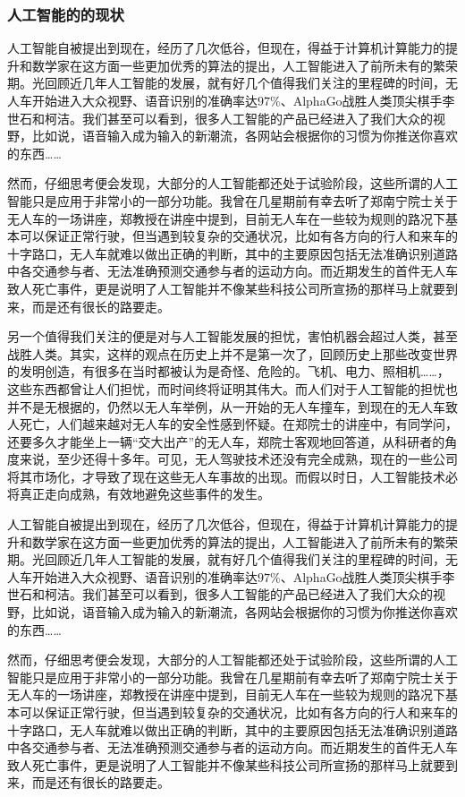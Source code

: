 \documentclass[UTF8]{XJTUthesis}
\begin{document}
\subsubsection{人工智能的的现状}
人工智能自被提出到现在，经历了几次低谷，但现在，得益于计算机计算能力的提升和数学家在这方面一些更加优秀的算法的提出，人工智能进入了前所未有的繁荣期。光回顾近几年人工智能的发展，就有好几个值得我们关注的里程碑的时间，无人车开始进入大众视野、语音识别的准确率达$97\%$、AlphaGo战胜人类顶尖棋手李世石和柯洁。我们甚至可以看到，很多人工智能的产品已经进入了我们大众的视野，比如说，语音输入成为输入的新潮流，各网站会根据你的习惯为你推送你喜欢的东西……\par
然而，仔细思考便会发现，大部分的人工智能都还处于试验阶段，这些所谓的人工智能只是应用于非常小的一部分功能。我曾在几星期前有幸去听了郑南宁院士关于无人车的一场讲座，郑教授在讲座中提到，目前无人车在一些较为规则的路况下基本可以保证正常行驶，但当遇到较复杂的交通状况，比如有各方向的行人和来车的十字路口，无人车就难以做出正确的判断，其中的主要原因包括无法准确识别道路中各交通参与者、无法准确预测交通参与者的运动方向。而近期发生的首件无人车致人死亡事件，更是说明了人工智能并不像某些科技公司所宣扬的那样马上就要到来，而是还有很长的路要走。\par
另一个值得我们关注的便是对与人工智能发展的担忧，害怕机器会超过人类，甚至战胜人类。其实，这样的观点在历史上并不是第一次了，回顾历史上那些改变世界的发明创造，有很多在当时都被认为是奇怪、危险的。飞机、电力、照相机……，这些东西都曾让人们担忧，而时间终将证明其伟大。而人们对于人工智能的担忧也并不是无根据的，仍然以无人车举例，从一开始的无人车撞车，到现在的无人车致人死亡，人们越来越对无人车的安全性感到怀疑。在郑院士的讲座中，有同学问，还要多久才能坐上一辆“交大出产”的无人车，郑院士客观地回答道，从科研者的角度来说，至少还得十多年。可见，无人驾驶技术还没有完全成熟，现在的一些公司将其市场化，才导致了现在这些无人车事故的出现。而假以时日，人工智能技术必将真正走向成熟，有效地避免这些事件的发生。\par
人工智能自被提出到现在，经历了几次低谷，但现在，得益于计算机计算能力的提升和数学家在这方面一些更加优秀的算法的提出，人工智能进入了前所未有的繁荣期。光回顾近几年人工智能的发展，就有好几个值得我们关注的里程碑的时间，无人车开始进入大众视野、语音识别的准确率达$97\%$、AlphaGo战胜人类顶尖棋手李世石和柯洁。我们甚至可以看到，很多人工智能的产品已经进入了我们大众的视野，比如说，语音输入成为输入的新潮流，各网站会根据你的习惯为你推送你喜欢的东西……\par
然而，仔细思考便会发现，大部分的人工智能都还处于试验阶段，这些所谓的人工智能只是应用于非常小的一部分功能。我曾在几星期前有幸去听了郑南宁院士关于无人车的一场讲座，郑教授在讲座中提到，目前无人车在一些较为规则的路况下基本可以保证正常行驶，但当遇到较复杂的交通状况，比如有各方向的行人和来车的十字路口，无人车就难以做出正确的判断，其中的主要原因包括无法准确识别道路中各交通参与者、无法准确预测交通参与者的运动方向。而近期发生的首件无人车致人死亡事件，更是说明了人工智能并不像某些科技公司所宣扬的那样马上就要到来，而是还有很长的路要走。\par
\end{document}
